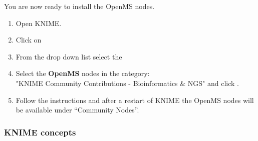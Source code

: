 You are now ready to install the OpenMS nodes.

\begin{enumerate}
\item Open KNIME.
\item Click on 
  

  \item From the  drop down list select the \\ \menu{\KnimeTrustedSite}
\item Select the \textbf{OpenMS} nodes in the category: \\ "KNIME Community Contributions - Bioinformatics \& NGS" and click .
\item Follow the instructions and after a restart of KNIME the OpenMS nodes will be available under “Community Nodes”.
\end{enumerate}


\subsubsection{KNIME concepts}

